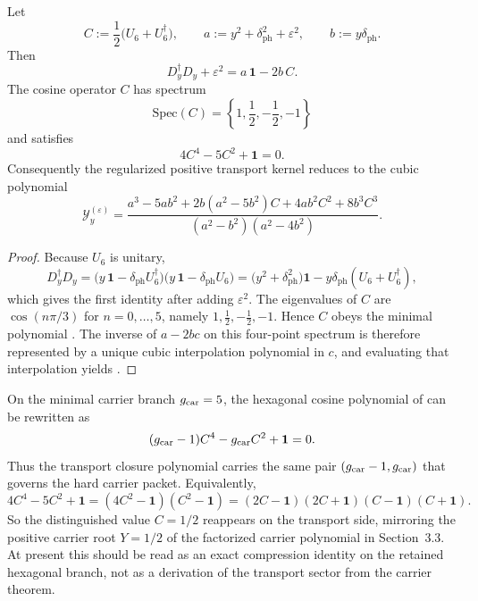 
\begin{proposition}
\label{prop:finite-positive-transport-algebra}
Let
\[
C:=\frac12\bigl(U_6+U_6^\dagger\bigr),
\qquad
a:=y^2+\delta_{\mathrm{ph}}^2+\varepsilon^2,
\qquad
b:=y\delta_{\mathrm{ph}}.
\]
Then
\[
D_y^\dagger D_y+\varepsilon^2=a\,\mathbf 1-2b\,C.
\]
The cosine operator $C$ has spectrum
\[
\mathrm{Spec}(C)=\left\{1,\frac12,-\frac12,-1\right\}
\]
and satisfies
\begin{equation}
\label{eq:c6-cosine-polynomial}
4C^4-5C^2+\mathbf 1=0.
\end{equation}
Consequently the regularized positive transport kernel reduces to the cubic polynomial
\begin{equation}
\label{eq:finite-positive-transport-kernel}
\mathcal Y_y^{(\varepsilon)}
=
\frac{
a^3-5ab^2
+2b(a^2-5b^2)C
+4ab^2C^2
+8b^3C^3
}{
(a^2-b^2)(a^2-4b^2)
}.
\end{equation}
\end{proposition}

\begin{proof}
Because $U_6$ is unitary,
\[
D_y^\dagger D_y
=
\bigl(y\,\mathbf 1-\delta_{\mathrm{ph}}U_6^\dagger\bigr)
\bigl(y\,\mathbf 1-\delta_{\mathrm{ph}}U_6\bigr)
=
\bigl(y^2+\delta_{\mathrm{ph}}^2\bigr)\mathbf 1
-y\delta_{\mathrm{ph}}(U_6+U_6^\dagger),
\]
which gives the first identity after adding $\varepsilon^2$. The eigenvalues of $C$ are $\cos(n\pi/3)$ for $n=0,\dots,5$, namely $1,\frac12,-\frac12,-1$. Hence $C$ obeys the minimal polynomial . The inverse of $a-2bc$ on this four-point spectrum is therefore represented by a unique cubic interpolation polynomial in $c$, and evaluating that interpolation yields .
\end{proof}

\begin{remark}\label{rem:transport-rank-echo}
On the minimal carrier branch $g_{\mathrm{car}}=5$, the hexagonal cosine polynomial of  can be rewritten as
\[
(g_{\mathrm{car}}-1)C^4-g_{\mathrm{car}} C^2+\mathbf 1=0.
\]
Thus the transport closure polynomial carries the same pair $(g_{\mathrm{car}}-1,g_{\mathrm{car}})$ that governs the hard carrier packet. Equivalently,
\[
4C^4-5C^2+\mathbf 1=(4C^2-\mathbf 1)(C^2-\mathbf 1)=(2C-\mathbf 1)(2C+\mathbf 1)(C-\mathbf 1)(C+\mathbf 1).
\]
So the distinguished value $C=1/2$ reappears on the transport side, mirroring the positive carrier root $Y=1/2$ of the factorized carrier polynomial in Section~3.3. At present this should be read as an exact compression identity on the retained hexagonal branch, not as a derivation of the transport sector from the carrier theorem.
\end{remark}

